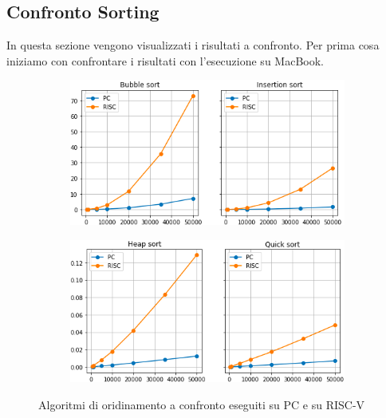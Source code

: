 \documentclass[12pt,a4paper]{report}
\begin{document}
\subsection{Confronto Sorting}
In questa sezione vengono visualizzati i risultati a confronto. Per prima cosa iniziamo con confrontare i risultati con l'esecuzione su MacBook.

\begin{figure}[ht]
     \centering
     \begin{subfigure}[t]{0.49\textwidth}
         \centering
         \includegraphics[width=\textwidth]{Img/GraficiSorting/BubbleInsert.png}
       
     \end{subfigure}
     \hfill
     \begin{subfigure}[t]{0.49\textwidth}
         \centering
         \includegraphics[width=\textwidth]{Img/GraficiSorting/HeapQuick.png}
        
     \end{subfigure}

   \caption{Algoritmi di oridinamento a confronto eseguiti su PC e su RISC-V}
   \label{Fig:AllSort_PC}
\end{figure}
	
\end{document}
